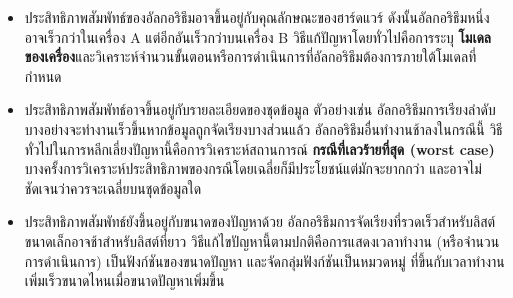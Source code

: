 \begin{itemize}


\item ประสิทธิภาพสัมพัทธ์ของอัลกอริธึมอาจขึ้นอยู่กับคุณลักษณะของฮาร์ดแวร์ 
ดังนั้นอัลกอริธึมหนึ่งอาจเร็วกว่าในเครื่อง A แต่อีกอันเร็วกว่าบนเครื่อง B 
วิธีแก้ปัญหาโดยทั่วไปคือการระบุ {\bf โมเดลของเครื่อง}และวิเคราะห์จำนวนขั้นตอนหรือการดำเนินการที่อัลกอริธึมต้องการภายใต้โมเดลที่กำหนด


\item ประสิทธิภาพสัมพัทธ์อาจขึ้นอยู่กับรายละเอียดของชุดข้อมูล ตัวอย่างเช่น 
อัลกอริธึมการเรียงลำดับบางอย่างจะทำงานเร็วขึ้นหากข้อมูลถูกจัดเรียงบางส่วนแล้ว อัลกอริธึมอื่นทำงานช้าลงในกรณีนี้ 
วิธีทั่วไปในการหลีกเลี่ยงปัญหานี้คือการวิเคราะห์สถานการณ์ {\bf กรณีที่เลวร้ายที่สุด (worst case)} 
บางครั้งการวิเคราะห์ประสิทธิภาพของกรณีโดยเฉลี่ยก็มีประโยชน์แต่มักจะยากกว่า และอาจไม่ชัดเจนว่าควรจะเฉลี่ยบนชุดข้อมูลใด


\item ประสิทธิภาพสัมพัทธ์ยังขึ้นอยู่กับขนาดของปัญหาด้วย อัลกอริธึมการจัดเรียงที่รวดเร็วสำหรับลิสต์ขนาดเล็กอาจช้าสำหรับลิสต์ที่ยาว 
วิธีแก้ไขปัญหานี้ตามปกติคือการแสดงเวลาทำงาน (หรือจำนวนการดำเนินการ) เป็นฟังก์ชันของขนาดปัญหา และจัดกลุ่มฟังก์ชันเป็นหมวดหมู่ 
ที่ขึ้นกับเวลาทำงานเพิ่มเร็วขนาดไหนเมื่อขนาดปัญหาเพิ่มขึ้น

\end{itemize}

